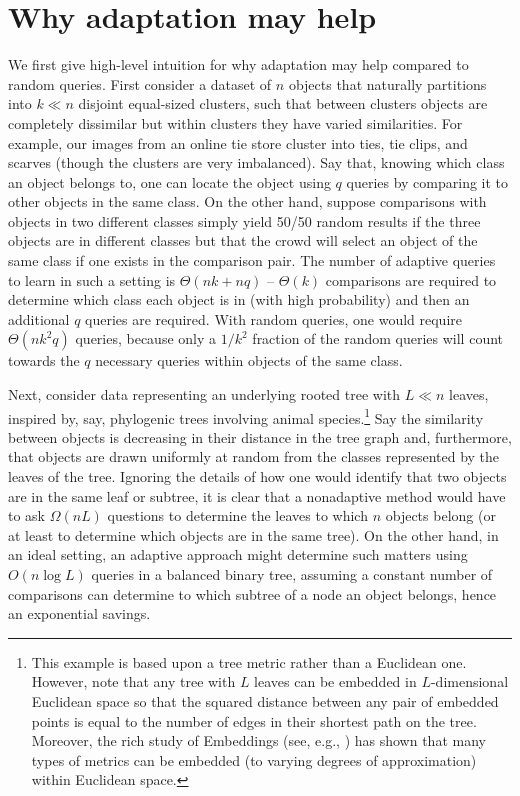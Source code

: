 \documentclass{article}
\begin{document}
\section{Why adaptation may help}
We first give high-level intuition for why adaptation may help
compared to random queries.  First consider a dataset of $n$ objects
that naturally partitions into $k \ll n$ disjoint equal-sized
clusters, such that between clusters objects are completely dissimilar
but within clusters they have varied similarities.  For example, our
images from an online tie store cluster into ties, tie clips, and
scarves (though the clusters are very imbalanced).  Say that, knowing
which class an object belongs to, one can locate the object using $q$
queries by comparing it to other objects in the same class.  On the
other hand, suppose comparisons with objects in two different classes
simply yield 50/50 random results if the three objects are in
different classes but that the crowd will select an object of the same
class if one exists in the comparison pair.  The number of adaptive
queries to learn in such a setting is $\Theta(nk+nq)$ -- $\Theta(k)$
comparisons are required to determine which class each object is in
(with high probability) and then an additional $q$ queries are
required.  With random queries, one would require $\Theta(n k^2 q)$
queries, because only a $1/k^2$ fraction of the random queries will
count towards the $q$ necessary queries within objects of the same
class.


Next, consider data representing an underlying rooted tree with $L \ll n$ leaves, inspired by, say, phylogenic trees involving animal species.\footnote{This example is based upon a tree metric rather than a Euclidean one.  However, note that any tree with $L$ leaves can be embedded in $L$-dimensional Euclidean space so that the squared distance between any pair of embedded points is equal to the number of edges in their shortest path on the tree.  Moreover, the rich study of Embeddings (see, e.g., \citealp{IM04}) has shown that many types of metrics can be embedded (to varying degrees of approximation) within Euclidean space.}  Say the similarity between objects is decreasing in their distance in the tree graph and, furthermore, that objects are drawn uniformly at random from the classes represented by the leaves of the tree.  Ignoring the details of how one would identify that two objects are in the same leaf or subtree, it is clear that a nonadaptive method would have to ask $\Omega(n L)$ questions to determine the leaves to which $n$ objects belong (or at least to determine which objects are in the same tree).  On the other hand, in an ideal setting, an adaptive approach might determine such matters using $O(n \log L)$ queries in a balanced binary tree, assuming a constant number of comparisons can determine to which subtree of a node an object belongs, hence an exponential savings.
\end{document}
